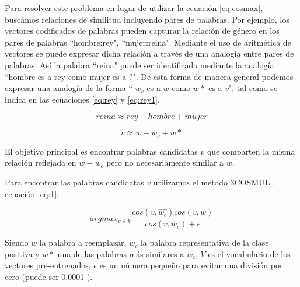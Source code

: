  Para resolver este problema en lugar de utilizar la ecuación \ref{eq:cosmax}, buscamos relaciones de similitud incluyendo pares de palabras. 
 Por ejemplo, los vectores codificados de palabras pueden capturar la relación de género en los pares de palabras ``hombre:rey", ``mujer:reina".
Mediante el uso de aritmética de vectores se puede expresar dicha relación a través de una analogía entre pares de palabras. Así la palabra ``reina"  
puede ser identificada mediante la analogía ``hombre es a rey como mujer es a ?". De esta forma de manera general podemos expresar una analogía de la forma `` $w_c$ es a $w$ como $w*$ es a $v$", tal como se indica en las ecuaciones \ref{eq:rey} y \ref{eq:rey1}. 
 
 \begin{equation}
    \label{eq:rey}
     reina \approx  rey-hombre+mujer
 \end{equation}

\begin{equation}
    \label{eq:rey1}
    v \approx w-w_c+w*
\end{equation}
 

 El objetivo principal es encontrar palabras candidatas $v$ que comparten la misma relación reflejada en $w-w_c$ pero no necesariamente similar a $w$. 
 
Para encontrar las palabras candidatas $v$ utilizamos el método 3COSMUL \citep{levy2014linguistic}, ecuación \ref{eq:1}:

\begin{equation} \label{eq:1}
    argmax_{v \in V}\frac{cos(v,\hat{w_c}) cos (v,w)}{cos (v,w_c)+ \epsilon}
\end{equation} 

Siendo $w$ la palabra a reemplazar, $w_c$ la palabra representativa de la clase positiva y $w*$ una de las palabras más similares a $w_c$, $V$ es el vocabulario de los vectores pre-entrenados, $\epsilon$  es un número pequeño para evitar una división por cero (puede ser 0.0001 ).




